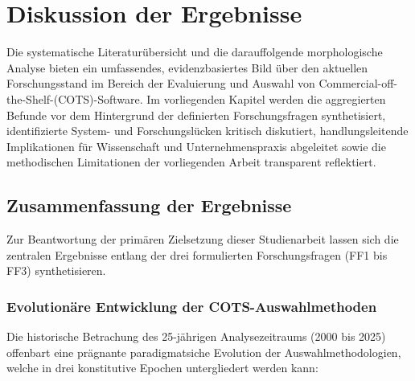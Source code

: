 \section{Diskussion der Ergebnisse}
\label{sec:diskussion}

Die systematische Literaturübersicht und die darauffolgende morphologische Analyse bieten ein umfassendes, evidenzbasiertes Bild über den aktuellen Forschungsstand im Bereich der Evaluierung und Auswahl von Commercial-off-the-Shelf-(COTS)-Software. Im vorliegenden Kapitel werden die aggregierten Befunde vor dem Hintergrund der definierten Forschungsfragen synthetisiert, identifizierte System- und Forschungslücken kritisch diskutiert, handlungsleitende Implikationen für Wissenschaft und Unternehmenspraxis abgeleitet sowie die methodischen Limitationen der vorliegenden Arbeit transparent reflektiert.

\subsection{Zusammenfassung der Ergebnisse}
\label{subsec:zusammenfassung_ergebnisse}

Zur Beantwortung der primären Zielsetzung dieser Studienarbeit lassen sich die zentralen Ergebnisse entlang der drei formulierten Forschungsfragen (FF1 bis FF3) synthetisieren.

\subsubsection{Evolutionäre Entwicklung der COTS-Auswahlmethoden}

Die historische Betrachung des 25-jährigen Analysezeitraums (2000 bis 2025) offenbart eine prägnante paradigmatsiche Evolution der Auswahlmethodologien, welche in drei konstitutive Epochen untergliedert werden kann:

